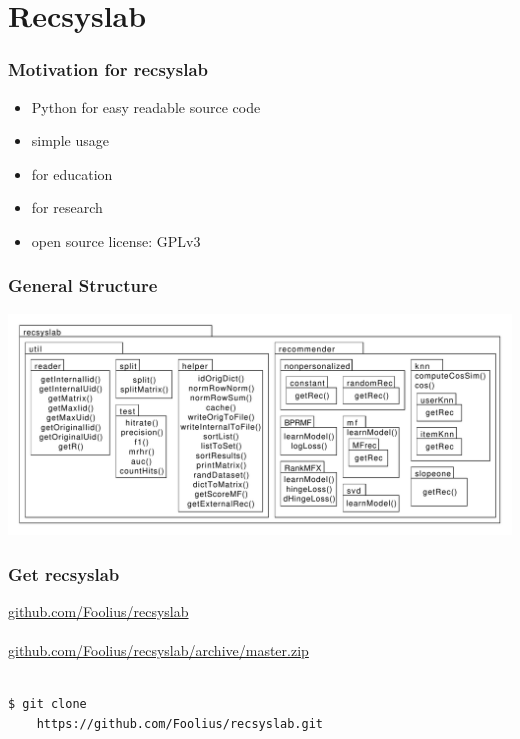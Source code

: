 \documentclass[mathserif,svgnames]{beamer}
\begin{document}
\section{Recsyslab}
\begin{frame} 
\frametitle{Motivation for recsyslab} %
\begin{itemize}
    \item Python for easy readable source code
    \item simple usage
    \item for education
    \item for research
    \item open source license: GPLv3
\end{itemize}
\end{frame}
\begin{frame}
\frametitle{General Structure}
\begin{center}
    \includegraphics[page=1, scale=0.3]{packagediagram.pdf}
\end{center}
\end{frame}
\begin{frame}[fragile]
    \frametitle{Get recsyslab}
    \url{github.com/Foolius/recsyslab}\\
    \hspace*{8cm}\\
    \url{github.com/Foolius/recsyslab/archive/master.zip}\\
    \hspace*{8cm}\\
    \begin{lstlisting}[style=pseudocode]
$ git clone 
    https://github.com/Foolius/recsyslab.git
    \end{lstlisting}
\end{frame}
\end{document}
